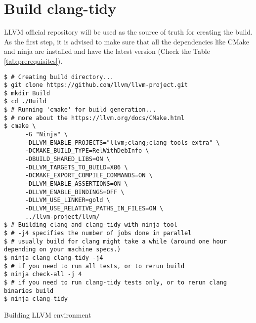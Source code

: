 \section{Build clang-tidy}

LLVM official repository will be used as the source of truth for creating the build. As the first step, it is advised to make sure that all the dependencies like CMake and ninja are installed and have the latest version (Check the Table \ref{tab:prerequisites}).


\begin{listing}
\begin{verbatim}
$ # Creating build directory...
$ git clone https://github.com/llvm/llvm-project.git
$ mkdir Build
$ cd ./Build
$ # Running 'cmake' for build generation...
$ # more about the https://llvm.org/docs/CMake.html
$ cmake \
      -G "Ninja" \
      -DLLVM_ENABLE_PROJECTS="llvm;clang;clang-tools-extra" \
      -DCMAKE_BUILD_TYPE=RelWithDebInfo \
      -DBUILD_SHARED_LIBS=ON \
      -DLLVM_TARGETS_TO_BUILD=X86 \
      -DCMAKE_EXPORT_COMPILE_COMMANDS=ON \
      -DLLVM_ENABLE_ASSERTIONS=ON \
      -DLLVM_ENABLE_BINDINGS=OFF \
      -DLLVM_USE_LINKER=gold \
      -DLLVM_USE_RELATIVE_PATHS_IN_FILES=ON \
      ../llvm-project/llvm/
$ # Building clang and clang-tidy with ninja tool
$ # -j4 specifies the number of jobs done in parallel
$ # usually build for clang might take a while (around one hour depending on your machine specs.)
$ ninja clang clang-tidy -j4
$ # if you need to run all tests, or to rerun build  
$ ninja check-all -j 4
$ # if you need to run clang-tidy tests only, or to rerun clang binaries build
$ ninja clang-tidy
\end{verbatim}
\caption{Building LLVM environment}
\label{code:build-llvm-dev}
\end{listing}


